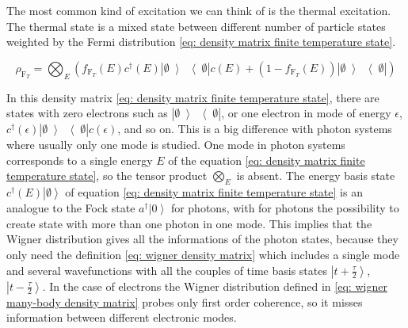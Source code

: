 The most common kind of excitation we can think of is the thermal excitation.
The thermal state is a mixed state between different number of particle states weighted by the Fermi distribution \eqref{eq: density matrix finite temperature state}.

\begin{equation}
\rho_{\mathrm{F}_{T}} = \bigotimes_{E}^{}\left(f_{\mathrm{F}_{T}}\left(E\right)c^{\dagger}\left(E\right)\left|\emptyset\left>\right<\emptyset\right|c(E)+\left(1-f_{\mathrm{F}_{T}}\left(E\right)\right)\left|\emptyset\left>\right<\emptyset\right|\right) \label{eq: density matrix finite temperature state}
\end{equation}

In this density matrix \eqref{eq: density matrix finite temperature state}, there are states with zero electrons such as $\left|\emptyset\left>\right<\emptyset\right|$, or one electron in mode of energy $\epsilon$, $c^{\dagger}(\epsilon)\left|\emptyset\left>\right<\emptyset\right|c(\epsilon)$, and so on.
This is a big difference with photon systems where usually only one mode is studied.
One mode in photon systems corresponds to a single energy $E$ of the equation \eqref{eq: density matrix finite temperature state}, so the tensor product $\bigotimes_{E}$ is absent.
The energy basis state $c^{\dagger}\left(E\right)\left|\emptyset\right>$ of equation \eqref{eq: density matrix finite temperature state} is an analogue to the Fock state $a^{\dagger}\left|0\right>$ for photons, with for photons the possibility to create state with more than one photon in one mode.
This implies that the Wigner distribution gives all the informations of the photon states, because they only need the definition \eqref{eq: wigner density matrix} which includes a single mode and several wavefunctions with all the couples of time basis states $\left|t+\frac{\tau}{2}\right>$,$\left|t-\frac{\tau}{2}\right>$.
In the case of electrons the Wigner distribution defined in \eqref{eq: wigner many-body density matrix} probes only first order coherence, so it misses information between different electronic modes.

